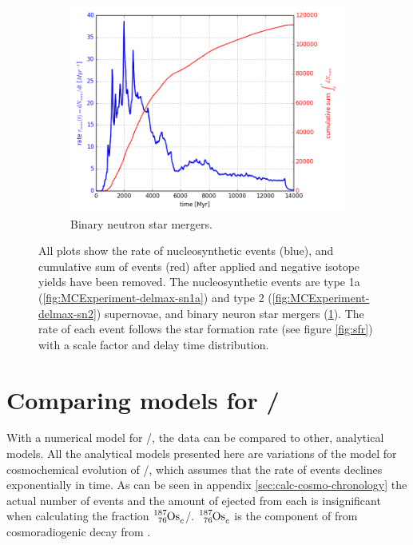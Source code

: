 \begin{figure}
\begin{subfigure}{\figwidth}
    \includegraphics[width=\linewidth]{results/MCExperiment_revised_2_delmax/nsm.png}
    \caption{ \label{fig:MCExperiment-delmax-nsm} \footnotesize
      Binary neutron star mergers.
    }
  \end{subfigure}
  \caption[Rate of nucleosynthetic events]{ \label{fig:MCExperiment-delmax-rate}
    All plots show the rate of nucleosynthetic events (blue), and cumulative sum of events (red)
    after \betadecay applied and negative isotope yields have been removed.
    The nucleosynthetic events are type 1a (\ref{fig:MCExperiment-delmax-sn1a}) and type 2 (\ref{fig:MCExperiment-delmax-sn2})
    supernovae, and binary neuron star mergers (\ref{fig:MCExperiment-delmax-nsm}).
    The rate of each event follows the star formation rate (see figure \ref{fig:sfr}) with a scale factor and delay time distribution.
  } 
\end{figure}
\FloatBarrier %

\section{Comparing models for /}
With a numerical model for /, the data can be compared to other, analytical models.
All the analytical models presented here are variations of the  model for cosmochemical evolution of /,
which assumes that the rate of events declines exponentially in time.
As can be seen in appendix \ref{sec:calc-cosmo-chronology} the actual number of events and the amount of  ejected from each is insignificant when calculating the fraction $\os{187}_c$/. $\os{187}_c$ is the component of  from cosmoradiogenic decay from .

